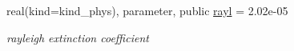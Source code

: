 \begin{Indent}
\begin{DoxyCompactItemize}
real(kind=kind\+\_\+phys), parameter, public \hyperlink{group__module__radsw__kgbnn_gaf3641febf88e97741b2cd86a56eda843}{rayl} = 2.\+02e-\/05
\begin{DoxyCompactList}\small\item\em rayleigh extinction coefficient \end{DoxyCompactList}\end{DoxyCompactItemize}
\end{Indent}
